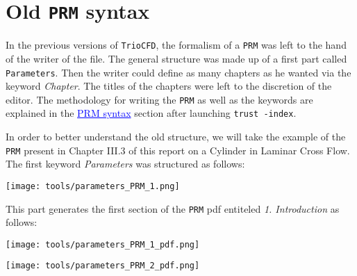 \section{\label{sec:Old-PRM-syntax}Old \texttt{PRM} syntax}
In the previous versions of \texttt{TrioCFD}, the formalism of a \texttt{PRM} was left to the hand of the writer of the file. 
The general structure was made up of a first part called \texttt{Parameters}. Then the writer could define as many chapters as he wanted via the keyword \textit{Chapter}.
The titles of the chapters were left to the discretion of the editor.
The methodology for writing the \texttt{PRM} as well as the keywords are explained in the \textcolor{blue}{\underline{PRM syntax}} section after launching \verb "trust -index".\newline \newline

In order to better understand the old structure, we will take the example of the \texttt{PRM} present in Chapter III.3 of
this report on a Cylinder in Laminar Cross Flow. The first keyword \textit{Parameters} was structured as follows:\newline
\begin{center}\texttt{[image: tools/parameters\_PRM\_1.png]}\end{center}
\begin{center}\end{center}

This part generates the first section of the \texttt{PRM} pdf entiteled \textit{1. Introduction} as follows:\newline
\setlength{\columnseprule}{0.5pt}
\begin{multicols}{2}
\begin{flushleft}\texttt{[image: tools/parameters\_PRM\_1\_pdf.png]}\end{flushleft}
\columnbreak
\vspace{0.5cm}\begin{flushright}\texttt{[image: tools/parameters\_PRM\_2\_pdf.png]}\end{flushright}
\end{multicols}
\begin{center}\end{center}

